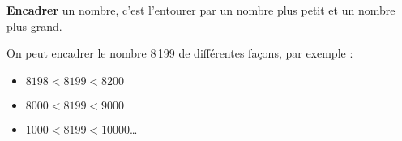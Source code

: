 \begin{defi*}{}{}
{\bf Encadrer} un nombre, c'est l'entourer par un nombre plus petit et un nombre plus grand.
\end{defi*}

\begin{exemple*}{}{}
On peut encadrer le nombre 8\,199 de différentes façons, par exemple :   
\begin{itemize}
	\item $\num{8198}<\num{8199}<\num{8200}$
	\item $\num{8000}<\num{8199}<\num{9000}$
	\item $\num{1000}<\num{8199}<\num{10000}$\dots
\end{itemize}
\end{exemple*}